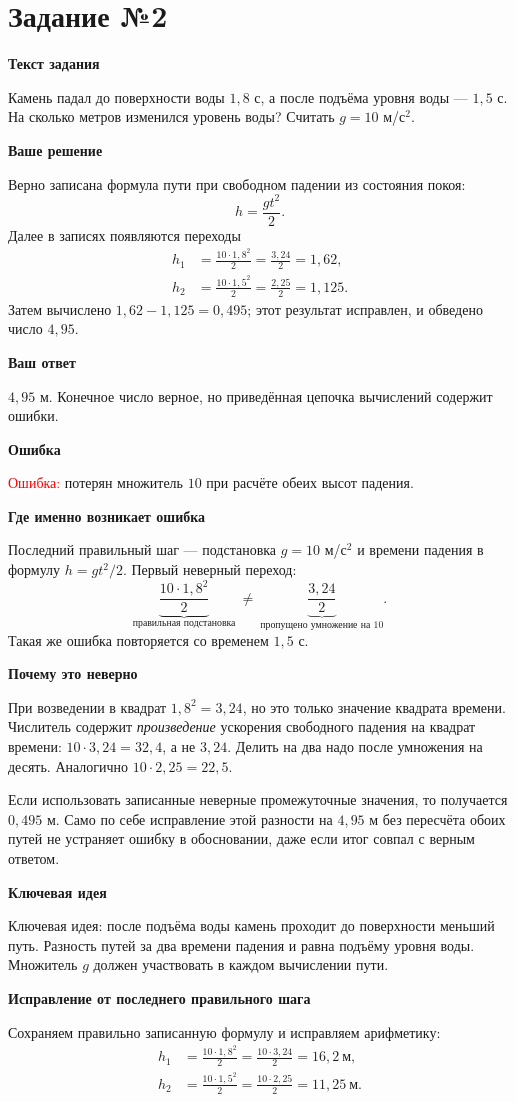 \documentclass[12pt,a4paper]{article}
\newcommand{\taskheading}[1]{\phantomsection\label{task:#1}\section*{Задание №#1}}
\newcommand{\reviewline}[1]{\par\medskip\textbf{#1}\par\smallskip}
\begin{document}
\newpage
\taskheading{2}
\reviewline{Текст задания}
Камень падал до поверхности воды $1{,}8$ с, а после подъёма уровня воды --- $1{,}5$ с. На сколько метров изменился уровень воды? Считать $g=10$ м/с$^2$.

\reviewline{Ваше решение}
Верно записана формула пути при свободном падении из состояния покоя:
\[
 h=\frac{gt^2}{2}.
\]
Далее в записях появляются переходы
\[
\begin{aligned}
 h_1&=\frac{10\cdot 1{,}8^2}{2}
     =\frac{3{,}24}{2}=1{,}62,\\
 h_2&=\frac{10\cdot 1{,}5^2}{2}
     =\frac{2{,}25}{2}=1{,}125.
\end{aligned}
\]
Затем вычислено $1{,}62-1{,}125=0{,}495$; этот результат исправлен, и обведено число $4{,}95$.

\reviewline{Ваш ответ}
$4{,}95$ м. Конечное число верное, но приведённая цепочка вычислений содержит ошибки.

\reviewline{Ошибка}
\textcolor{red}{Ошибка:} потерян множитель $10$ при расчёте обеих высот падения.

\reviewline{Где именно возникает ошибка}
Последний правильный шаг --- подстановка $g=10$ м/с$^2$ и времени падения в формулу $h=gt^2/2$. Первый неверный переход:
\[
\underbrace{\frac{10\cdot1{,}8^2}{2}}_{\text{правильная подстановка}}
\ \not=\ \underbrace{\frac{3{,}24}{2}}_{\text{пропущено умножение на }10}.
\]
Такая же ошибка повторяется со временем $1{,}5$ с.

\reviewline{Почему это неверно}
При возведении в квадрат $1{,}8^2=3{,}24$, но это только значение квадрата времени. Числитель содержит \emph{произведение} ускорения свободного падения на квадрат времени: $10\cdot3{,}24=32{,}4$, а не $3{,}24$. Делить на два надо после умножения на десять. Аналогично $10\cdot2{,}25=22{,}5$.

Если использовать записанные неверные промежуточные значения, то получается $0{,}495$ м. Само по себе исправление этой разности на $4{,}95$ м без пересчёта обоих путей не устраняет ошибку в обосновании, даже если итог совпал с верным ответом.

\reviewline{Ключевая идея}
\textcolor{blue!60!black}{Ключевая идея:} после подъёма воды камень проходит до поверхности меньший путь. Разность путей за два времени падения и равна подъёму уровня воды. Множитель $g$ должен участвовать в каждом вычислении пути.

\reviewline{Исправление от последнего правильного шага}
Сохраняем правильно записанную формулу и исправляем арифметику:
\[
\begin{aligned}
 h_1&=\frac{10\cdot1{,}8^2}{2}=\frac{10\cdot3{,}24}{2}=16{,}2\ \text{м},\\
 h_2&=\frac{10\cdot1{,}5^2}{2}=\frac{10\cdot2{,}25}{2}=11{,}25\ \text{м}.
\end{aligned}
\]
\end{document}
